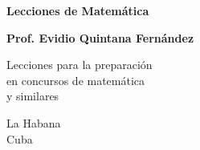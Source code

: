\begin{titlepage}
    \begin{center}
        \vspace*{1cm}
        
        \Huge
        \textbf{Lecciones de Matemática}
        
        \vspace{0.5cm}
        \LARGE
        
    
        \textbf{Prof. Evidio Quintana Fernández}
        
        \vfill
        
        Lecciones para la preparación\\
        en concursos de matemática\\
        y similares
    
        
      
        \vfill
        
        \Large
        La Habana\\
        Cuba\\
        \vspace{1.0cm}
        
    \end{center}
    
\end{titlepage}
